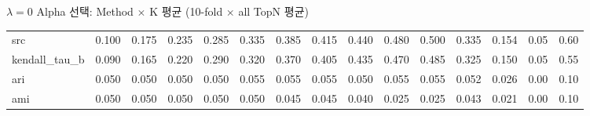 \documentclass[aspectratio=169,10pt]{beamer}
\begin{document}
\begin{frame}[shrink=12]{$\lambda=0$ Alpha 선택: Method $\times$ K 평균 \textnormal{\small(10-fold $\times$ all TopN 평균)}}
\begin{center}
\begin{tabular}{l|rrrrrrrrrr|rrrr}
		src   & 0.100 & 0.175 & 0.235 & 0.285 & 0.335 & 0.385 & 0.415 & 0.440 & 0.480 & 0.500 & 0.335 & 0.154 & 0.05 & 0.60 \\
		kendall\_tau\_b & 0.090 & 0.165 & 0.220 & 0.290 & 0.320 & 0.370 & 0.405 & 0.435 & 0.470 & 0.485 & 0.325 & 0.150 & 0.05 & 0.55 \\
		ari   & 0.050 & 0.050 & 0.050 & 0.050 & 0.055 & 0.055 & 0.055 & 0.050 & 0.055 & 0.055 & 0.052 & 0.026 & 0.00 & 0.10 \\
		ami   & 0.050 & 0.050 & 0.050 & 0.050 & 0.050 & 0.045 & 0.045 & 0.040 & 0.025 & 0.025 & 0.043 & 0.021 & 0.00 & 0.10 \\
		\bottomrule
	\end{tabular}
	\end{center}
\end{frame}
\end{document}
